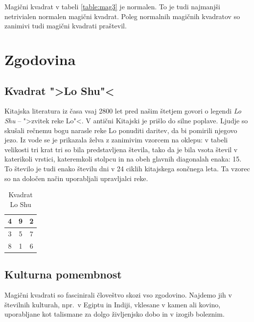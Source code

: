 \documentclass[a4paper,12pt]{article}
\newcommand{\pojem}[1]{\emph{\color{purple}#1}}
\theoremstyle{definition}
\theoremstyle{plain}
\newenvironment{magic}[3]
   {\begin{table}[!ht]
      \centering
      \caption{#2}
      \label{#3}
      \begin{tabular}{|*{#1}{c|}}
   }
   {\end{tabular}
      \end{table}}
\begin{document}
Magični kvadrat v tabeli \ref{table:mag3} je normalen.
To je tudi najmanjši netrivialen normalen magični kvadrat.
Poleg normalnih magičnih kvadratov so zanimivi tudi magični kvadrati praštevil.


\section{Zgodovina}

\subsection{Kvadrat ">Lo Shu"<}

Kitajska literatura iz časa vsaj 2800 let pred našim štetjem govori o legendi
\pojem{Lo Shu} -- ">zvitek reke Lo"<. V antični Kitajski je prišlo do
silne poplave. Ljudje so skušali rečnemu bogu narasle reke Lo ponuditi daritev,
da bi pomirili njegovo jezo. Iz vode se je prikazala želva z zanimivim vzorcem
na oklepu: v tabeli velikosti tri krat tri so bila predstavljena števila, tako
da je bila vsota števil v katerikoli vrstici, kateremkoli stolpcu in na obeh
glavnih diagonalah enaka: 15. To število je tudi enako številu dni v 24 ciklih
kitajskega sončnega leta. Ta vzorec so na določen način uporabljali upravljalci
reke.

\begin{magic}{3}{Kvadrat Lo Shu}{table:loshu}
   \hline
   4 & 9 & 2 \\ \hline
   3 & 5 & 7 \\ \hline
   8 & 1 & 6\\ \hline
\end{magic}

\subsection{Kulturna pomembnost}

Magični kvadrati so fascinirali človeštvo skozi vso zgodovino. Najdemo jih
v številnih kulturah, npr.\ v Egiptu in Indiji, vklesane v kamen ali
kovino, uporabljane kot talismane za dolgo življenjsko dobo in v
izogib boleznim.
\end{document}
